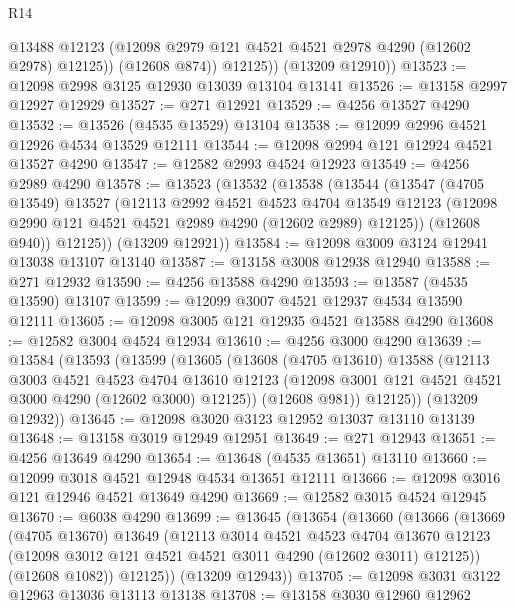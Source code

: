 \begin{lexlean}{R14}
\begin{coremodule}
              @13488
              @12123
              (@12098 @2979 @121 @4521 @4521 @2978 @4290 (@12602 @2978) @12125))
            (@12608 @874))
          @12125))
      (@13209 @12910))
@13523 := @12098 @2998 @3125 @12930 @13039 @13104 @13141
@13526 := @13158 @2997 @12927 @12929
@13527 := @271 @12921
@13529 := @4256 @13527 @4290
@13532 := @13526 (@4535 @13529) @13104
@13538 := @12099 @2996 @4521 @12926 @4534 @13529 @12111
@13544 := @12098 @2994 @121 @12924 @4521 @13527 @4290
@13547 := @12582 @2993 @4524 @12923
@13549 := @4256 @2989 @4290
@13578 := @13523
    (@13532
      (@13538
        (@13544
          (@13547
            (@4705 @13549)
            @13527
            (@12113
              @2992
              @4521
              @4523
              @4704
              @13549
              @12123
              (@12098 @2990 @121 @4521 @4521 @2989 @4290 (@12602 @2989) @12125))
            (@12608 @940))
          @12125))
      (@13209 @12921))
@13584 := @12098 @3009 @3124 @12941 @13038 @13107 @13140
@13587 := @13158 @3008 @12938 @12940
@13588 := @271 @12932
@13590 := @4256 @13588 @4290
@13593 := @13587 (@4535 @13590) @13107
@13599 := @12099 @3007 @4521 @12937 @4534 @13590 @12111
@13605 := @12098 @3005 @121 @12935 @4521 @13588 @4290
@13608 := @12582 @3004 @4524 @12934
@13610 := @4256 @3000 @4290
@13639 := @13584
    (@13593
      (@13599
        (@13605
          (@13608
            (@4705 @13610)
            @13588
            (@12113
              @3003
              @4521
              @4523
              @4704
              @13610
              @12123
              (@12098 @3001 @121 @4521 @4521 @3000 @4290 (@12602 @3000) @12125))
            (@12608 @981))
          @12125))
      (@13209 @12932))
@13645 := @12098 @3020 @3123 @12952 @13037 @13110 @13139
@13648 := @13158 @3019 @12949 @12951
@13649 := @271 @12943
@13651 := @4256 @13649 @4290
@13654 := @13648 (@4535 @13651) @13110
@13660 := @12099 @3018 @4521 @12948 @4534 @13651 @12111
@13666 := @12098 @3016 @121 @12946 @4521 @13649 @4290
@13669 := @12582 @3015 @4524 @12945
@13670 := @6038 @4290
@13699 := @13645
    (@13654
      (@13660
        (@13666
          (@13669
            (@4705 @13670)
            @13649
            (@12113
              @3014
              @4521
              @4523
              @4704
              @13670
              @12123
              (@12098 @3012 @121 @4521 @4521 @3011 @4290 (@12602 @3011) @12125))
            (@12608 @1082))
          @12125))
      (@13209 @12943))
@13705 := @12098 @3031 @3122 @12963 @13036 @13113 @13138
@13708 := @13158 @3030 @12960 @12962

\end{coremodule}
\end{lexlean}
